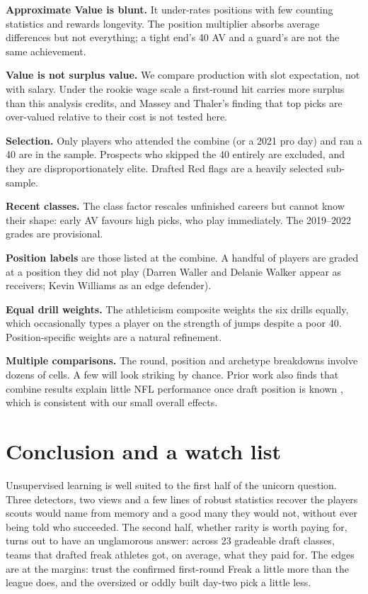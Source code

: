 \documentclass[11pt]{article}
\begin{document}
\textbf{Approximate Value is blunt.} It under-rates positions with few counting statistics and rewards longevity. The position multiplier absorbs average differences but not everything; a tight end's 40 AV and a guard's are not the same achievement.

\textbf{Value is not surplus value.} We compare production with slot expectation, not with salary. Under the rookie wage scale a first-round hit carries more surplus than this analysis credits, and Massey and Thaler's \cite{massey} finding that top picks are over-valued relative to their cost is not tested here.

\textbf{Selection.} Only players who attended the combine (or a 2021 pro day) and ran a 40 are in the sample. Prospects who skipped the 40 entirely are excluded, and they are disproportionately elite. Drafted Red flags are a heavily selected sub-sample.

\textbf{Recent classes.} The class factor rescales unfinished careers but cannot know their shape: early AV favours high picks, who play immediately. The 2019--2022 grades are provisional.

\textbf{Position labels} are those listed at the combine. A handful of players are graded at a position they did not play (Darren Waller and Delanie Walker appear as receivers; Kevin Williams as an edge defender).

\textbf{Equal drill weights.} The athleticism composite weights the six drills equally, which occasionally types a player on the strength of jumps despite a poor 40. Position-specific weights are a natural refinement.

\textbf{Multiple comparisons.} The round, position and archetype breakdowns involve dozens of cells. A few will look striking by chance. Prior work also finds that combine results explain little NFL performance once draft position is known \cite{kuzmits,robbins,berri}, which is consistent with our small overall effects.

\section{Conclusion and a watch list}

Unsupervised learning is well suited to the first half of the unicorn question. Three detectors, two views and a few lines of robust statistics recover the players scouts would name from memory and a good many they would not, without ever being told who succeeded. The second half, whether rarity is worth paying for, turns out to have an unglamorous answer: across 23 gradeable draft classes, teams that drafted freak athletes got, on average, what they paid for. The edges are at the margins: trust the confirmed first-round Freak a little more than the league does, and the oversized or oddly built day-two pick a little less.
\end{document}
